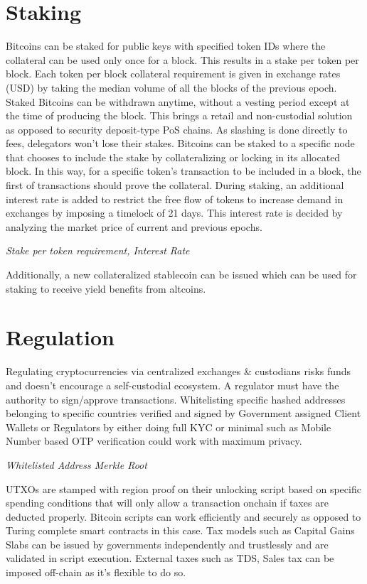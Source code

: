 \documentclass[a4paper,10pt]{article}
\begin{document}
\section{Staking}
Bitcoins can be staked for public keys with specified token IDs where the collateral can be used only once for a block. This results in a stake per token per block. Each token per block collateral requirement is given in exchange rates (USD) by taking the median volume of all the blocks of the previous epoch. Staked Bitcoins can be withdrawn anytime, without a vesting period except at the time of producing the block. This brings a retail and non-custodial solution as opposed to security deposit-type PoS chains. As slashing is done directly to fees, delegators won't lose their stakes. Bitcoins can be staked to a specific node that chooses to include the stake by collateralizing or locking in its allocated block. In this way, for a specific token's transaction to be included in a block, the first of transactions should prove the collateral. During staking, an additional interest rate is added to restrict the free flow of tokens to increase demand in exchanges by imposing a timelock of 21 days. This interest rate is decided by analyzing the market price of current and previous epochs.

\textit{Stake per token requirement, Interest Rate}

Additionally, a new collateralized stablecoin can be issued which can be used for staking to receive yield benefits from altcoins. 
\section{Regulation}
Regulating cryptocurrencies via centralized exchanges \& custodians risks funds and doesn't encourage a self-custodial ecosystem. A regulator must have the authority to sign/approve transactions. Whitelisting specific hashed addresses belonging to specific countries verified and signed by Government assigned Client Wallets or Regulators by either doing full KYC or minimal such as Mobile Number based OTP verification could work with maximum privacy.

\textit{Whitelisted Address Merkle Root}

 UTXOs are stamped with region proof on their unlocking script based on specific spending conditions that will only allow a transaction onchain if taxes are deducted properly. Bitcoin scripts can work efficiently and securely as opposed to Turing complete smart contracts in this case. Tax models such as Capital Gains Slabs can be issued by governments independently and trustlessly and are validated in script execution. External taxes such as TDS, Sales tax can be imposed off-chain as it's flexible to do so.
\end{document}

